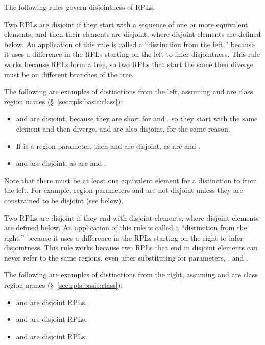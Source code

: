   The following rules govern disjointness of
RPLs.

 Two RPLs are disjoint if they
start with a sequence of one or more equivalent elements, and then
their elements are disjoint, where disjoint elements are defined
below.  An application of this rule is called a ``distinction from the
left,'' because it uses a difference in the RPLs starting on the left
to infer disjointness.  This rule works because RPLs form a tree, so
two RPLs that start the same then diverge must be on different
branches of the tree.

The following are examples of distinctions from the left, assuming
 and  are class region names
(\S~\ref{sec:rpls:basic:class}):
%
\begin{itemize}
%
\item {} and  are disjoint, because they are short for
   and , so they start with the same element
   and then diverge.   and  are also
  disjoint, for the same reason.
%
\item If  is a region parameter, then  and 
  are disjoint, as are  and .
%
\item {} and  are disjoint, as are
   and .
%
\end{itemize}
%
Note that there must be at least one equivalent element for a
distinction to from the left.  For example, region parameters 
and  are not disjoint unless they are constrained to be
disjoint (see below).

 Two RPLs are disjoint if they
end with disjoint elements, where disjoint elements are defined below.
An application of this rule is called a ``distinction from the
right,'' because it uses a difference in the RPLs starting on the
right to infer disjointness.  This rule works because two RPLs that
end in disjoint elements can never refer to the same regions, even
after substituting for parameters, \kwd{*}, and \kwd{[?]}.

The following are examples of distinctions from the right, assuming
 and  are class region names
(\S~\ref{sec:rpls:basic:class}):
%
\begin{itemize}
%
\item {} and  are disjoint RPLs.
%
\item {} and  are disjoint RPLs.
%
\item {} and  are disjoint RPLs.
%
\end{itemize}

